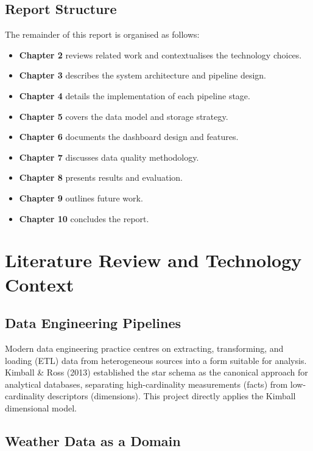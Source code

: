 \documentclass[12pt,a4paper]{report}
\begin{document}
\section{Report Structure}

The remainder of this report is organised as follows:

\begin{itemize}
  \item \textbf{Chapter 2} reviews related work and contextualises the technology choices.
  \item \textbf{Chapter 3} describes the system architecture and pipeline design.
  \item \textbf{Chapter 4} details the implementation of each pipeline stage.
  \item \textbf{Chapter 5} covers the data model and storage strategy.
  \item \textbf{Chapter 6} documents the dashboard design and features.
  \item \textbf{Chapter 7} discusses data quality methodology.
  \item \textbf{Chapter 8} presents results and evaluation.
  \item \textbf{Chapter 9} outlines future work.
  \item \textbf{Chapter 10} concludes the report.
\end{itemize}

\chapter{Literature Review and Technology Context}

\section{Data Engineering Pipelines}

Modern data engineering practice centres on extracting, transforming, and loading (ETL) data from heterogeneous sources into a form suitable for analysis. Kimball \& Ross (2013) established the star schema as the canonical approach for analytical databases, separating high-cardinality measurements (facts) from low-cardinality descriptors (dimensions). This project directly applies the Kimball dimensional model.

\section{Weather Data as a Domain}
\end{document}
